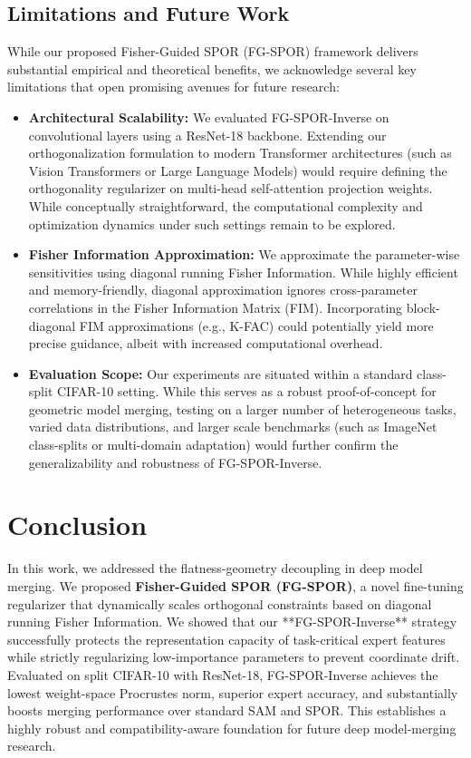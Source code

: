 \documentclass{article}
\theoremstyle{plain}
\theoremstyle{definition}
\theoremstyle{remark}
\begin{document}
\subsection{Limitations and Future Work}
While our proposed Fisher-Guided SPOR (FG-SPOR) framework delivers substantial empirical and theoretical benefits, we acknowledge several key limitations that open promising avenues for future research:
\begin{itemize}
    \item \textbf{Architectural Scalability:} We evaluated FG-SPOR-Inverse on convolutional layers using a ResNet-18 backbone. Extending our orthogonalization formulation to modern Transformer architectures (such as Vision Transformers or Large Language Models) would require defining the orthogonality regularizer on multi-head self-attention projection weights. While conceptually straightforward, the computational complexity and optimization dynamics under such settings remain to be explored.
    \item \textbf{Fisher Information Approximation:} We approximate the parameter-wise sensitivities using diagonal running Fisher Information. While highly efficient and memory-friendly, diagonal approximation ignores cross-parameter correlations in the Fisher Information Matrix (FIM). Incorporating block-diagonal FIM approximations (e.g., K-FAC) could potentially yield more precise guidance, albeit with increased computational overhead.
    \item \textbf{Evaluation Scope:} Our experiments are situated within a standard class-split CIFAR-10 setting. While this serves as a robust proof-of-concept for geometric model merging, testing on a larger number of heterogeneous tasks, varied data distributions, and larger scale benchmarks (such as ImageNet class-splits or multi-domain adaptation) would further confirm the generalizability and robustness of FG-SPOR-Inverse.
\end{itemize}

\section{Conclusion}
\label{submission-conclusion}
In this work, we addressed the flatness-geometry decoupling in deep model merging. We proposed \textbf{Fisher-Guided SPOR (FG-SPOR)}, a novel fine-tuning regularizer that dynamically scales orthogonal constraints based on diagonal running Fisher Information. We showed that our **FG-SPOR-Inverse** strategy successfully protects the representation capacity of task-critical expert features while strictly regularizing low-importance parameters to prevent coordinate drift. Evaluated on split CIFAR-10 with ResNet-18, FG-SPOR-Inverse achieves the lowest weight-space Procrustes norm, superior expert accuracy, and substantially boosts merging performance over standard SAM and SPOR. This establishes a highly robust and compatibility-aware foundation for future deep model-merging research.
\end{document}
